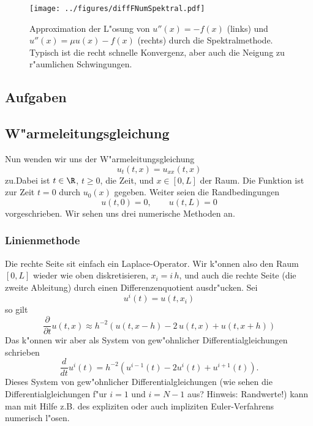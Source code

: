 
\begin{figure}[htbp]
 \centering
   \texttt{[image: ../figures/diffFNumSpektral.pdf]}
   \caption{Approximation der L"osung von $u''(x) = -f(x)$ (links)
   und $u''(x) = \mu u(x)-f(x)$ (rechts) durch die Spektralmethode. 
   Typisch ist die recht schnelle Konvergenz, aber auch die Neigung 
   zu r"aumlichen Schwingungen.}
   \label{numPDESpekExpl}
\end{figure}



\subsection*{Aufgaben}
\begin{auf}\chc\label{bloc11XA3}

\end{auf}

\begin{auf}\chd\label{bloc11XA4}

\end{auf}



\subsection{W"armeleitungsgleichung}

Nun wenden wir uns der W"armeleitungsgleichung 
$$ u_t(t,x) = u_{xx}(t,x)$$
zu.Dabei ist $t\in\R$, $t\geq 0$, die Zeit, und $x\in[0, L]$ der Raum.
Die Funktion ist zur Zeit $t=0$ durch $u_0(x)$ gegeben. Weiter seien die
Randbedingungen 
$$ u(t,0)=0,\qquad u(t,L)=0$$
vorgeschrieben. 
  Wir sehen uns drei numerische Methoden an.

\subsubsection{Linienmethode}

Die rechte Seite sit einfach ein Laplace-Operator. Wir k"onnen 
also den Raum $[0,L]$ wieder wie oben diskretisieren, 
$x_i = i\, h$, und auch die rechte Seite (die zweite Ableitung)
durch einen Differenzenquotient ausdr"ucken.
Sei
$$ u^i(t) = u(t,x_i)$$
so gilt 
$$ \frac{\partial}{\partial t}u(t,x) \approx h^{-2} (u(t,x-h)-2\, u(t,x)+ u(t,x+h))$$
Das k"onnen wir aber als 
System von gew"ohnlicher Differentialgleichungen schrieben
$$ \frac d {dt} u^i(t) = h^{-2} (u^{i-1}(t) - 2 u^i(t) + u^{i+1}(t)).$$
Dieses System von gew"ohnlicher Differentialgleichungen
(wie sehen die Differentialgleichungen f"ur $i=1$ und $i=N-1$ aus?
Hinweis: Randwerte!) 
kann man mit Hilfe z.B. des expliziten oder auch impliziten Euler-Verfahrens numerisch l"osen.

